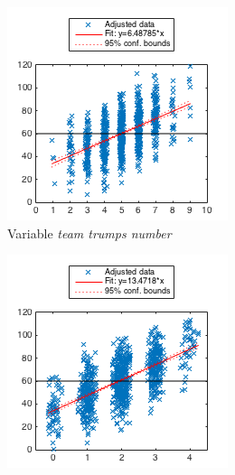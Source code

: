 \begin{figure}[h]
        \centering
        \begin{subfigure}[h]{0.32\textwidth}
                \includegraphics[width=\textwidth]{./img/5/teamTrumpsNumber}
                \caption{Variable \emph{team trumps number}}
                \label{fig:teamTrumpsNumber}
        \end{subfigure}
        \begin{subfigure}[h]{0.32\textwidth}
                \includegraphics[width=\textwidth]{./img/5/teamAcesNumber}

\end{subfigure}
\end{figure}
